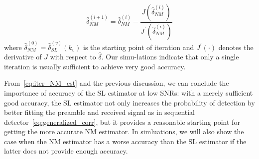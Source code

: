 \begin{equation}
  \label{eq:iter_NM_est}
  \hat{\delta}_{NM}^{(i+1)}=\hat{\delta}_{NM}^{(i)}-
  \frac{J(\hat{\delta}_{NM}^{(i)})}{J^\prime(\hat{\delta}_{NM}^{(i)})}
\end{equation}
where $\hat{\delta}_{NM}^{(0)}=\hat{\delta}^{(v)}_{SL}(k_v)$ is the starting point of iteration and
$J^\prime(\cdot)$ denotes the derivative of $J$ with respect to $\hat{\delta}$. 
Our simu-lations indicate that only a single iteration is usually sufficient to achieve very good accuracy.

From~\eqref{eq:iter_NM_est} and the previous discussion, we can conclude the importance of accuracy of the SL estimator
at low SNRs: 
with a merely sufficient good accuracy, the SL estimator not only increases the probability of detection by better
fitting the preamble and received signal as in sequential detector~\eqref{eq:generalized_corr}, but 
it provides a reasonable starting point for getting the more accurate NM estimator. In simluations,
we will also show the case when the NM estimator has a worse accuracy than the SL estimator if the latter does not provide enough accuracy. 

